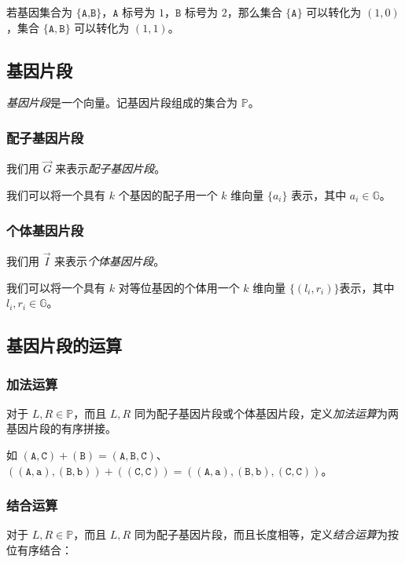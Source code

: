 \documentclass{article}
\begin{document}
若基因集合为 $\{\texttt{A,B}\}$，$\texttt{A}$ 标号为 $1$，$\texttt{B}$ 标号为 $2$，那么集合 $\{\texttt{A}\}$ 可以转化为 $(1,0)$，集合 $\{\texttt{A},\texttt{B}\}$ 可以转化为 $(1,1)$。

\subsection{基因片段}

\textsl{基因片段}是一个向量。记基因片段组成的集合为 $\mathbb{P}$。

\subsubsection*{配子基因片段}

我们用 $\vec G$ 来表示\textsl{配子基因片段}。

我们可以将一个具有 $k$ 个基因的配子用一个 $k$ 维向量 $\{a_i\}$ 表示，其中 $a_i \in \mathbb{G}$。

\subsubsection*{个体基因片段}

我们用 $\vec I$ 来表示\textsl{个体基因片段}。

我们可以将一个具有 $k$ 对等位基因的个体用一个 $k$ 维向量 $\{(l_i,r_i)\}$表示，其中 $l_i,r_i \in \mathbb{G}$。

\subsection{基因片段的运算}

\subsubsection*{加法运算}

对于 $L,R \in \mathbb{P}$，而且 $L,R$ 同为配子基因片段或个体基因片段，定义\textsl{加法运算}为两基因片段的有序拼接。

如 $(\texttt{A},\texttt{C}) + (\texttt{B}) = (\texttt{A},\texttt{B},\texttt{C})$、$((\texttt{A},\texttt{a}),(\texttt{B},\texttt{b}))+((\texttt{C},\texttt{C}))=((\texttt{A},\texttt{a}),(\texttt{B},\texttt{b}),(\texttt{C},\texttt{C}))$。

\subsubsection*{结合运算}

对于 $L,R \in \mathbb{P}$，而且 $L,R$ 同为配子基因片段，而且长度相等，定义\textsl{结合运算}为按位有序结合：
\end{document}
